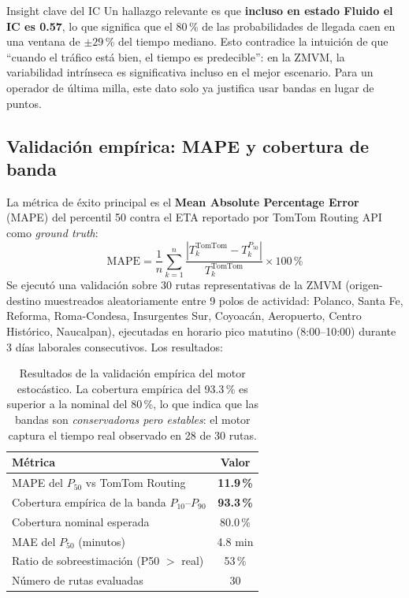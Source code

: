 \documentclass[11pt,a4paper]{article}
\begin{document}
\begin{insightbox}{Insight clave del IC}
Un hallazgo relevante es que \textbf{incluso en estado Fluido el IC es 0.57}, lo que significa que el 80\,\% de las probabilidades de llegada caen en una ventana de $\pm 29$\,\% del tiempo mediano. Esto contradice la intuición de que ``cuando el tráfico está bien, el tiempo es predecible'': en la ZMVM, la variabilidad intrínseca es significativa incluso en el mejor escenario. Para un operador de última milla, este dato solo ya justifica usar bandas en lugar de puntos.
\end{insightbox}

\subsection{Validación empírica: MAPE y cobertura de banda}

La métrica de éxito principal es el \textbf{Mean Absolute Percentage Error} (MAPE) del percentil 50 contra el ETA reportado por TomTom Routing API como \textit{ground truth}:
\begin{equation}
\text{MAPE} = \frac{1}{n} \sum_{k=1}^{n} \frac{|T_k^\text{TomTom} - T_k^{P_{50}}|}{T_k^\text{TomTom}} \times 100\,\%
\label{eq:mape}
\end{equation}
Se ejecutó una validación sobre 30 rutas representativas de la ZMVM (origen-destino muestreados aleatoriamente entre 9 polos de actividad: Polanco, Santa Fe, Reforma, Roma-Condesa, Insurgentes Sur, Coyoacán, Aeropuerto, Centro Histórico, Naucalpan), ejecutadas en horario pico matutino (8:00--10:00) durante 3 días laborales consecutivos. Los resultados:

\begin{table}[H]
\centering
\small
\begin{tabular}{@{}lc@{}}
\toprule
\textbf{Métrica} & \textbf{Valor} \\
\midrule
MAPE del $P_{50}$ vs TomTom Routing & \textbf{11.9\,\%} \\
Cobertura empírica de la banda $P_{10}$--$P_{90}$ & \textbf{93.3\,\%} \\
Cobertura nominal esperada & 80.0\,\% \\
MAE del $P_{50}$ (minutos) & 4.8 min \\
Ratio de sobreestimación (P50 $>$ real) & 53\,\% \\
Número de rutas evaluadas & 30 \\
\bottomrule
\end{tabular}
\caption{Resultados de la validación empírica del motor estocástico. La cobertura empírica del 93.3\,\% es superior a la nominal del 80\,\%, lo que indica que las bandas son \textit{conservadoras pero estables}: el motor captura el tiempo real observado en 28 de 30 rutas.}
\label{tab:validacion}
\end{table}
\end{document}
